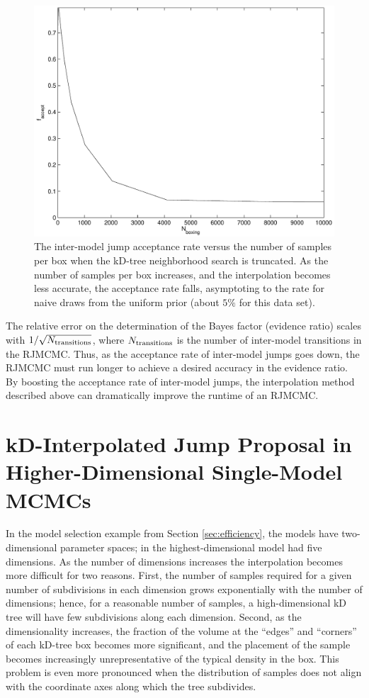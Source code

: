 \documentclass{iopart}
\begin{document}
\begin{figure}
  \begin{center}
    \includegraphics[width=0.8\columnwidth]{Figure2_acceptRate}
  \end{center}
  \caption{\label{fig:acceptRate} The inter-model jump acceptance rate
    versus the number of samples per box when the kD-tree neighborhood
    search is truncated.  As the number of samples per box increases,
    and the interpolation becomes less accurate, the acceptance rate
    falls, asymptoting to the rate for naive draws from the uniform
    prior (about $5\%$ for this data set).}
\end{figure}

The relative error on the determination of the Bayes factor (evidence ratio) scales
with $1/\sqrt{N_{\textnormal{transitions}}}$, where
$N_{\textnormal{transitions}}$ is the number of inter-model
transitions in the RJMCMC.  Thus, as the acceptance rate of
inter-model jumps goes down, the RJMCMC must run longer to achieve a
desired accuracy in the evidence ratio.  By boosting the acceptance
rate of inter-model jumps, the interpolation method described above
can dramatically improve the runtime of an RJMCMC.

\section{kD-Interpolated Jump Proposal in Higher-Dimensional
  Single-Model MCMCs}
\label{sec:higherdim}

In the model selection example from Section \ref{sec:efficiency}, the
models have two-dimensional parameter spaces; in \cite{Farr2010} the
highest-dimensional model had five dimensions.  As the number of
dimensions increases the interpolation becomes more difficult for two
reasons.  First, the number of samples required for a given
number of subdivisions in each dimension grows exponentially with
the number of dimensions; hence, for a reasonable number of samples, a high-dimensional kD tree will have few subdivisions along each dimension.  Second, as
the dimensionality increases, the fraction of the volume at the ``edges'' and ``corners'' of each kD-tree box becomes more significant, and the placement of the sample becomes increasingly unrepresentative of the typical density in the box.  This problem is even more
pronounced when the distribution of samples does not align with the
coordinate axes along which the tree subdivides.  
\end{document}
